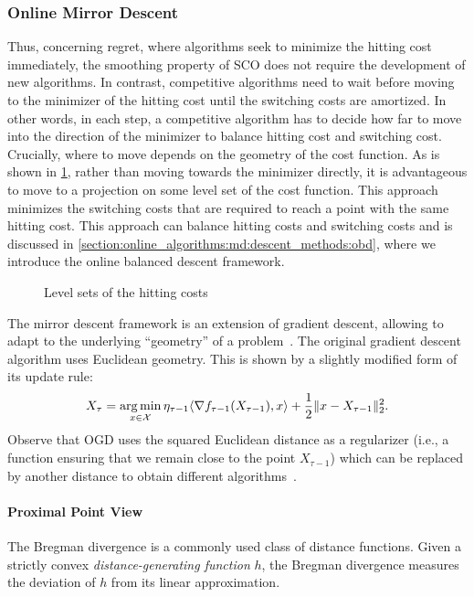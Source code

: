 \subsubsection{Online Mirror Descent}\label{section:online_algorithms:md:descent_methods:omd}

Thus, concerning regret, where algorithms seek to minimize the hitting cost immediately, the smoothing property of SCO does not require the development of new algorithms. In contrast, competitive algorithms need to wait before moving to the minimizer of the hitting cost until the switching costs are amortized. In other words, in each step, a competitive algorithm has to decide how far to move into the direction of the minimizer to balance hitting cost and switching cost. Crucially, where to move depends on the geometry of the cost function. As is shown in \cref{fig:level_sets_of_the_hitting_costs}, rather than moving towards the minimizer directly, it is advantageous to move to a projection on some level set of the cost function. This approach minimizes the switching costs that are required to reach a point with the same hitting cost. This approach can balance hitting costs and switching costs and is discussed in \cref{section:online_algorithms:md:descent_methods:obd}, where we introduce the online balanced descent framework.

\begin{figure}
    \centering
    [TODO]
    \caption{Level sets of the hitting costs}
    \label{fig:level_sets_of_the_hitting_costs}
\end{figure}

The mirror descent framework is an extension of gradient descent, allowing to adapt to the underlying ``geometry'' of a problem~\cite{Gupta2020}. The original gradient descent algorithm uses Euclidean geometry. This is shown by a slightly modified form of its update rule: \begin{align*}
    X_{\tau} = \operatorname*{arg\,min}_{x \in \mathcal{X}} \eta_{\tau-1} \langle\nabla f_{\tau-1}(X_{\tau-1}), x\rangle + \frac{1}{2} \lVert x - X_{\tau-1}\rVert_2^2.
\end{align*} Observe that OGD uses the squared Euclidean distance as a regularizer (i.e., a function ensuring that we remain close to the point $X_{\tau-1}$) which can be replaced by another distance to obtain different algorithms~\cite{Gupta2020}.

\paragraph{Proximal Point View} The Bregman divergence is a commonly used class of distance functions. Given a strictly convex \emph{distance-generating function} $h$, the Bregman divergence measures the deviation of $h$ from its linear approximation.

